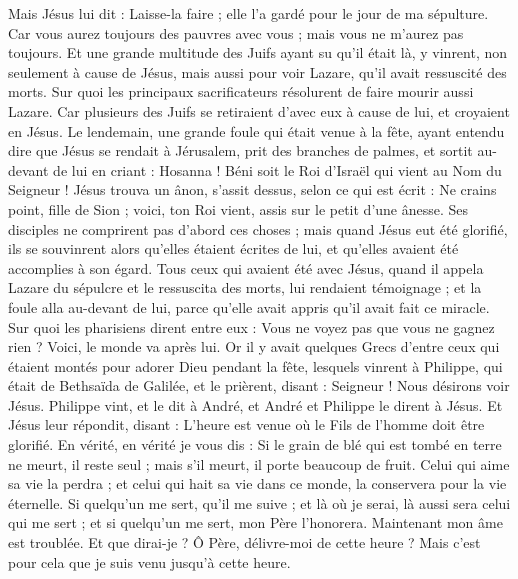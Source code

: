 \begin{multicols}{2}
Mais Jésus lui dit : Laisse-la faire ; elle l'a gardé pour le jour de ma sépulture.
Car vous aurez toujours des pauvres avec vous ; mais vous ne m'aurez pas toujours.
Et une grande multitude des Juifs ayant su qu'il était là, y vinrent, non seulement à cause de Jésus, mais aussi pour voir Lazare, qu'il avait ressuscité des morts.
Sur quoi les principaux sacrificateurs résolurent de faire mourir aussi Lazare.
Car plusieurs des Juifs se retiraient d'avec eux à cause de lui, et croyaient en Jésus.
Le lendemain, une grande foule qui était venue à la fête, ayant entendu dire que Jésus se rendait à Jérusalem,
prit des branches de palmes, et sortit au-devant de lui en criant : Hosanna ! Béni soit le Roi d'Israël qui vient au Nom du Seigneur !
Jésus trouva un ânon, s'assit dessus, selon ce qui est écrit :
Ne crains point, fille de Sion ; voici, ton Roi vient, assis sur le petit d'une ânesse.
Ses disciples ne comprirent pas d'abord ces choses ; mais quand Jésus eut été glorifié, ils se souvinrent alors qu'elles étaient écrites de lui, et qu'elles avaient été accomplies à son égard.
Tous ceux qui avaient été avec Jésus, quand il appela Lazare du sépulcre et le ressuscita des morts, lui rendaient témoignage ;
et la foule alla au-devant de lui, parce qu'elle avait appris qu'il avait fait ce miracle.
Sur quoi les pharisiens dirent entre eux : Vous ne voyez pas que vous ne gagnez rien ? Voici, le monde va après lui.
Or il y avait quelques Grecs d'entre ceux qui étaient montés pour adorer Dieu pendant la fête,
lesquels vinrent à Philippe, qui était de Bethsaïda de Galilée, et le prièrent, disant : Seigneur ! Nous désirons voir Jésus.
Philippe vint, et le dit à André, et André et Philippe le dirent à Jésus.
Et Jésus leur répondit, disant : L'heure est venue où le Fils de l'homme doit être glorifié.
En vérité, en vérité je vous dis : Si le grain de blé qui est tombé en terre ne meurt, il reste seul ; mais s'il meurt, il porte beaucoup de fruit.
Celui qui aime sa vie la perdra ; et celui qui hait sa vie dans ce monde, la conservera pour la vie éternelle.
Si quelqu'un me sert, qu'il me suive ; et là où je serai, là aussi sera celui qui me sert ; et si quelqu'un me sert, mon Père l'honorera.
Maintenant mon âme est troublée. Et que dirai-je ? Ô Père, délivre-moi de cette heure ? Mais c'est pour cela que je suis venu jusqu'à cette heure.

\end{multicols}
